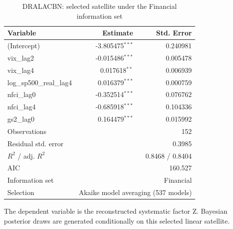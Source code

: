 \begin{table}[!htbp]
\centering
\caption{DRALACBN: selected satellite under the Financial information set}
\label{tab:dralacbn_financial_satellite}
\begin{tabular}{lrr}
\toprule
Variable & Estimate & Std. Error \\
\midrule
(Intercept) & -3.805475$^{***}$ & 0.240981 \\
vix_lag2 & -0.015486$^{***}$ & 0.005478 \\
vix_lag4 & 0.017618$^{**}$ & 0.006939 \\
log_sp500_real_lag4 & 0.016379$^{***}$ & 0.000759 \\
nfci_lag0 & -0.352514$^{***}$ & 0.076762 \\
nfci_lag4 & -0.685918$^{***}$ & 0.104336 \\
gs2_lag0 & 0.164479$^{***}$ & 0.015992 \\
\midrule
Observations & \multicolumn{2}{r}{152} \\
Residual std. error & \multicolumn{2}{r}{0.3985} \\
$R^2$ / adj. $R^2$ & \multicolumn{2}{r}{0.8468 / 0.8404} \\
AIC & \multicolumn{2}{r}{160.527} \\
Information set & \multicolumn{2}{r}{Financial} \\
Selection & \multicolumn{2}{r}{Akaike model averaging (537 models)} \\
\bottomrule
\end{tabular}
\begin{tablenotes}
\small
\item The dependent variable is the reconstructed systematic factor Z. Bayesian posterior draws are generated conditionally on this selected linear satellite.
\end{tablenotes}
\end{table}
